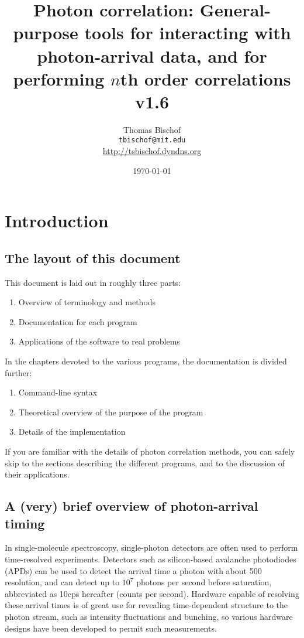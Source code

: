 \documentclass{article}
\title{Photon correlation: General-purpose tools for interacting with photon-arrival data, and for performing $n$th order correlations \\ 
v1.6}
\author{Thomas Bischof \\ \texttt{tbischof@mit.edu} \\ \url{http://tsbischof.dyndns.org}}
\date{\today}
\newcommand{\cps}{\textnormal{cps}}
\numberwithin{equation}{section}
\numberwithin{figure}{section}
\begin{document}
\maketitle
\tableofcontents
\newpage
 
\section{Introduction}
\subsection{The layout of this document}
This document is laid out in roughly three parts:
\begin{enumerate}
\item Overview of terminology and methods
\item Documentation for each program
\item Applications of the software to real problems
\end{enumerate}
In the chapters devoted to the various programs, the documentation is divided further:
\begin{enumerate}
\item Command-line syntax
\item Theoretical overview of the purpose of the program
\item Details of the implementation
\end{enumerate}
If you are familiar with the details of photon correlation methods, you can safely skip to the sections describing the different programs, and to the discussion of their applications. 

\subsection{A (very) brief overview of photon-arrival timing}
In single-molecule spectroscopy, single-photon detectors are often used to perform time-resolved experiments. Detectors such as silicon-based avalanche photodiodes (APDs) can be used to detect the arrival time a photon with about 500\pico\second{} resolution, and can detect up to $10^{7}$ photons per second before saturation, abbreviated as 10\mega\cps{} hereafter (counts per second). Hardware capable of resolving these arrival times is of great use for revealing time-dependent structure to the photon stream, such as intensity fluctuations and bunching, so various hardware designs have been developed to permit such measurements.
\end{document}
